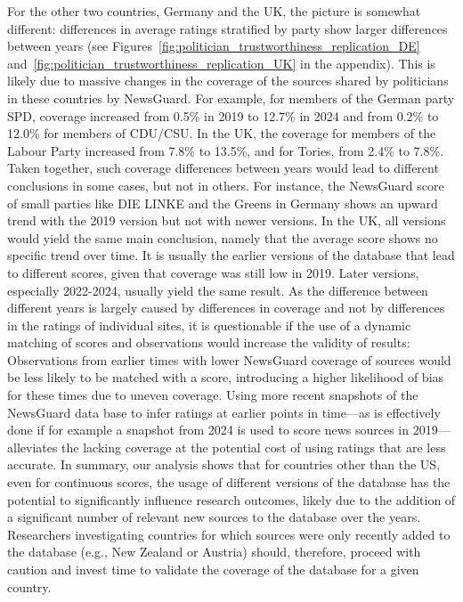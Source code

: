 \documentclass[12pt,twoside]{article}
\begin{document}
For the other two countries, Germany and the UK, the picture is somewhat different: differences in average ratings stratified by party show larger differences between years (see Figures~\ref{fig:politician_trustworthiness_replication_DE} and~\ref{fig:politician_trustworthiness_replication_UK} in the appendix). 
This is likely due to massive changes in the coverage of the sources shared by politicians in these countries by NewsGuard. 
For example, for members of the German party SPD, coverage increased from 0.5\% in 2019 to 12.7\% in 2024 and from 0.2\% to 12.0\% for members of CDU/CSU. 
In the UK, the coverage for members of the Labour Party increased from 7.8\% to 13.5\%, and for Tories, from 2.4\% to 7.8\%. 
Taken together, such coverage differences between years would lead to different conclusions in some cases, but not in others.
For instance, the NewsGuard score of small parties like DIE LINKE and the Greens in Germany shows an upward trend with the 2019 version but not with newer versions. 
In the UK, all versions would yield the same main conclusion, namely that the average score shows no specific trend over time. 
It is usually the earlier versions of the database that lead to different scores, given that coverage was still low in 2019. 
Later versions, especially 2022-2024, usually yield the same result.
As the difference between different years is largely caused by differences in coverage and not by differences in the ratings of individual sites, it is questionable if the use of a dynamic matching of scores and observations would increase the validity of results:
Observations from earlier times with lower NewsGuard coverage of sources would be less likely to be matched with a score, introducing a higher likelihood of bias for these times due to uneven coverage.
Using more recent snapshots of the NewsGuard data base to infer ratings at earlier points in time---as is effectively done if for example a snapshot from 2024 is used to score news sources in 2019---alleviates the lacking coverage at the potential cost of using ratings that are less accurate.
In summary, our analysis shows that for countries other than the US, even for continuous scores, the usage of different versions of the database has the potential to significantly influence research outcomes, likely due to the addition of a significant number of relevant new sources to the database over the years. 
Researchers investigating countries for which sources were only recently added to the database (e.g., New Zealand or Austria) should, therefore, proceed with caution and invest time to validate the coverage of the database for a given country. 
\end{document}
